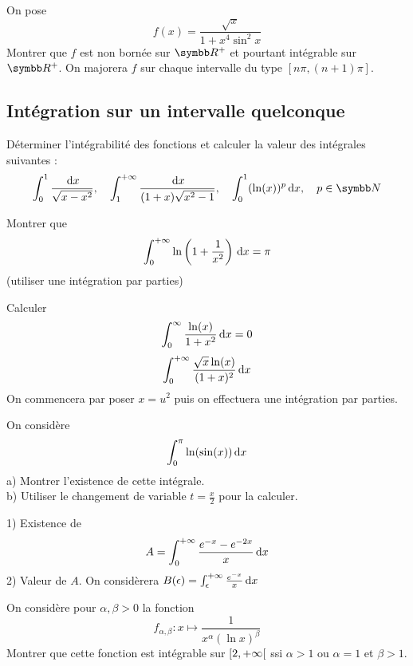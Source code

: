 \begin{exercice}
On pose
$$ f(x)=\frac{\sqrt{x}}{1+x^{4}\sin^{2}x} $$
Montrer que $f$ est non bornée sur $\R^{+}$ et pourtant intégrable sur $\R^{+}$.
On majorera $f$ sur chaque intervalle du type $[n\pi,(n+1)\pi]$.
\end{exercice}

\subsection{Intégration sur un intervalle quelconque}

\begin{exercice}
Déterminer l'intégrabilité des fonctions et calculer la valeur des intégrales suivantes :
$$ \int_{0}^{1}\frac{\dx}{\sqrt{x-x^{2}}}, \quad \int_{1}^{+\infty}\frac{\dx}{(1+x)\sqrt{x^{2}-1}}, \quad \int_{0}^{1}(\ln(x))^{p}\dx, \quad p\in\N $$
\end{exercice}

\begin{exercice}
Montrer que
$$ \int_{0}^{+\infty}\ln\left(1+\frac{1}{x^{2}}\right)\,\mathrm{d}x = \pi $$
(utiliser une intégration par parties)
\end{exercice}

\begin{exercice}
Calculer
$$ \int_{0}^{\infty}\frac{\ln(x)}{1+x^{2}}\,\mathrm{d}x=0 $$
$$ \int_{0}^{+\infty}\frac{\sqrt{x}\ln(x)}{(1+x)^{2}}\,\mathrm{d}x $$
On commencera par poser $x=u^{2}$ puis on effectuera une intégration par parties.
\end{exercice}

\begin{exercice}
On considère
$$ \int_{0}^{\pi}\ln(\sin(x))\,\mathrm{d}x $$
a) Montrer l'existence de cette intégrale. \\
b) Utiliser le changement de variable $t=\frac{x}{2}$ pour la calculer.
\end{exercice}

\begin{exercice}
1) Existence de
$$ A=\int_{0}^{+\infty}\frac{e^{-x}-e^{-2x}}{x}\,\mathrm{d}x $$
2) Valeur de $A$. On considèrera $B(\epsilon)=\int_{\epsilon}^{+\infty}\frac{e^{-x}}{x}\,\mathrm{d}x$
\end{exercice}

\begin{exercice}
On considère pour $\alpha,\beta>0$ la fonction
$$ f_{\alpha,\beta}:x\mapsto\frac{1}{x^{\alpha}(\ln x)^{\beta}} $$
Montrer que cette fonction est intégrable sur $\left[2, +\infty\right[$ ssi $\alpha>1$ ou $\alpha=1$ et $\beta>1$.
\end{exercice}

